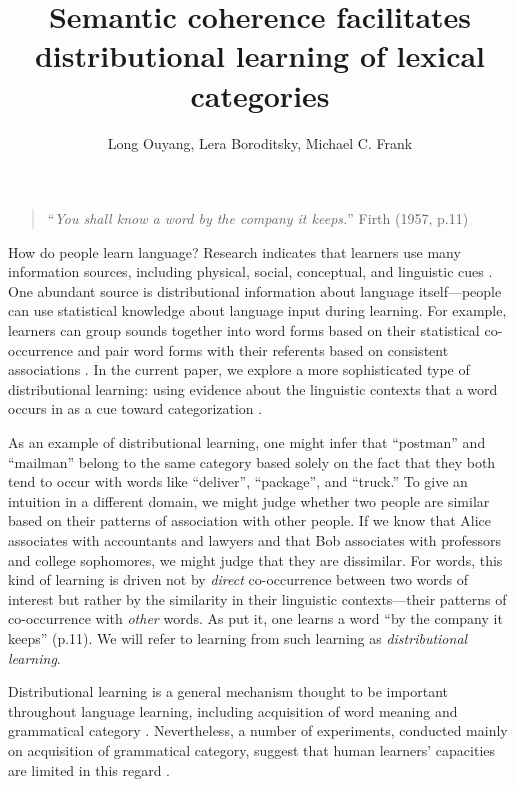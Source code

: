 \documentclass[man,floatsintext]{apa6}
\title{Semantic coherence facilitates distributional learning of lexical categories}
\author{Long Ouyang, Lera Boroditsky, Michael C. Frank}
\affiliation{Department of Psychology, Stanford University\vskip 5em Word count: 6,251}
\begin{document}
\maketitle

\begin{quote}
``\emph{You shall know a word by the company it keeps.}'' Firth (1957, p.11)
\end{quote}

How do people learn language? Research indicates that learners use many information sources, including physical, social, conceptual, and linguistic cues \citep{clark1988, markman1991, gleitman1990, baldwin1993, hollich2000}. One abundant source is distributional information about language itself---people can use statistical knowledge about language input during learning. For example, learners can group sounds together into word forms based on their statistical co-occurrence \citep{saffran1996a, saffran1996b} and pair word forms with their referents based on consistent associations \citep{yu2007,smith2008}. In the current paper, we explore a more sophisticated type of distributional learning: using evidence about the linguistic contexts that a word occurs in as a cue toward categorization \citep{smith1966, maratsos1980, braine1987, redington1998}.

As an example of distributional learning, one might infer that ``postman'' and ``mailman'' belong to the same category based solely on the fact that they both tend to occur with words like ``deliver'', ``package'', and ``truck.'' To give an intuition in a different domain, we might judge whether two people are similar based on their patterns of association with other people. If we know that Alice associates with accountants and lawyers and that Bob associates with professors and college sophomores, we might judge that they are dissimilar. For words, this kind of learning is driven not by \emph{direct} co-occurrence between two words of interest but rather by the similarity in their linguistic contexts---their patterns of co-occurrence with \emph{other} words. As \citet{firth1957} put it, one learns a word ``by the company it keeps'' (p.11). We will refer to learning from such learning as \emph{distributional learning}.

Distributional learning is a general mechanism thought to be important throughout language learning, including acquisition of word meaning \citep{landauer1997} and grammatical category \citep{redington1998}. Nevertheless, a number of experiments, conducted mainly on acquisition of grammatical category, suggest that human learners' capacities are limited in this regard \citep{braine1987, brooks1993, frigo1998, kempe2001, gerken2005, frank2011}.
\end{document}
